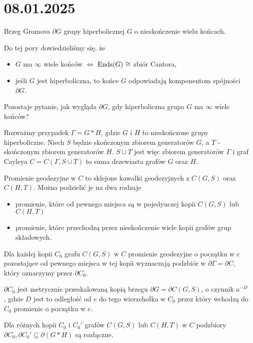 \section{08.01.2025}{Brzeg Gromova $\partial G$ grupy hiperbolicznej $G$ o nieskończenie wielu końcach.}

Do tej pory dowiedzieliśmy się, że
\begin{itemize}
  \item $G$ ma $\infty$ wiele końców $\iff$ $\operatorname{Ends}(G)\cong$ zbiór Cantora,
  \item jeśli $G$ jest hiperboliczna, to końce $G$ odpowiadają komponentom spójności $\partial G$.
\end{itemize}

Pozostaje pytanie, jak wygląda $\partial G$, gdy hiperboliczna grupa $G$ ma $\infty$ wiele końców?

Rozważmy przypadek $\Gamma=G\ast H$, gdzie $G$ i $H$ to nieskończone grupy hiperboliczne. Niech $S$ będzie skończonym zbiorem generatorów $G$, a $T$ - skończonym zbiorem generatorów $H$. $S\cup T$ jest więc zbiorem generatorów $\Gamma$ i graf Cayleya $C=C(\Gamma, S\cup T)$ to suma drzewiasta grafów $G$ oraz $H$.

Promienie geodezyjne w $C$ to sklejone kawałki geodezyjnych z $C(G,S)$ oraz $C(H,T)$. Można podzielić je na dwa rodzaje
\begin{itemize}
  \item promienie, które od pewnego miejsca są w pojedynczej kopii $C(G,S)$ lub $C(H,T)$
  \item promienie, które przechodzą przez nieskończenie wiele kopii grafów grup składowych.
\end{itemize}
Dla każdej kopii $C_0$ grafu $C(G,S)$ w $C$ promienie geodezyjne o początku w $e$ pozostające od pewnego miejsca w tej kopii wyznaczają podzbiór w $\partial\Gamma=\partial C$, który oznaczymy przez $\partial C_0$.

\begin{fact}{}{}
  $\partial C_0$ jest metrycznie przeskalowaną kopią brzegu $\partial G=\partial C(G,S)$, o czynnik $a^{-D}$, gdzie $D$ jest to odległość od $e$ do tego wierzchołka w $C_0$ przez który wchodzą do $C_0$ promienie o początku w $e$.
\end{fact}

\begin{fact}{}{}
  Dla różnych kopii $C_0$ i $C_0'$ grafów $C(G,S)$ lub $C(H,T)$ w $C$ podzbiory $\partial C_0,\partial C_0'\subseteq\partial (G\ast H)$ są rozłączne.
\end{fact}











